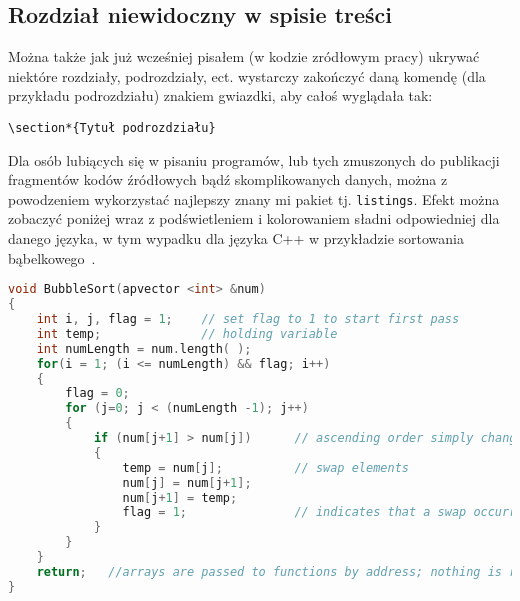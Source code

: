 \subsection*{Rozdział niewidoczny w spisie treści}
Można także jak już wcześniej pisałem (w kodzie zródłowym pracy) ukrywać niektóre rozdziały, podrozdziały, ect. wystarczy zakończyć daną komendę (dla przykładu podrozdziału) znakiem gwiazdki, aby całoś wyglądała tak:

\begin{verbatim}
\section*{Tytuł podrozdziału}
\end{verbatim}



Dla osób lubiących się w pisaniu programów, lub tych zmuszonych do publikacji fragmentów kodów źródłowych bądź skomplikowanych danych, można z powodzeniem wykorzystać najlepszy znany mi pakiet tj. \texttt{listings}. Efekt można zobaczyć poniżej wraz z podświetleniem i kolorowaniem sładni odpowiedniej dla danego języka, w tym wypadku dla języka C++ w przykładzie sortowania bąbelkowego~\parencite{url:cpp-bubble-sort}.

\begin{lstlisting}[label=lst:cpp-bubble-sort, caption=Sortowanie bąbelkowe w C++, language=C++]
void BubbleSort(apvector <int> &num)
{
    int i, j, flag = 1;    // set flag to 1 to start first pass
    int temp;              // holding variable
    int numLength = num.length( );
    for(i = 1; (i <= numLength) && flag; i++)
    {
        flag = 0;
        for (j=0; j < (numLength -1); j++)
        {
            if (num[j+1] > num[j])      // ascending order simply changes to <
            {
                temp = num[j];          // swap elements
                num[j] = num[j+1];
                num[j+1] = temp;
                flag = 1;               // indicates that a swap occurred.
            }
        }
    }
    return;   //arrays are passed to functions by address; nothing is returned
}
\end{lstlisting}

